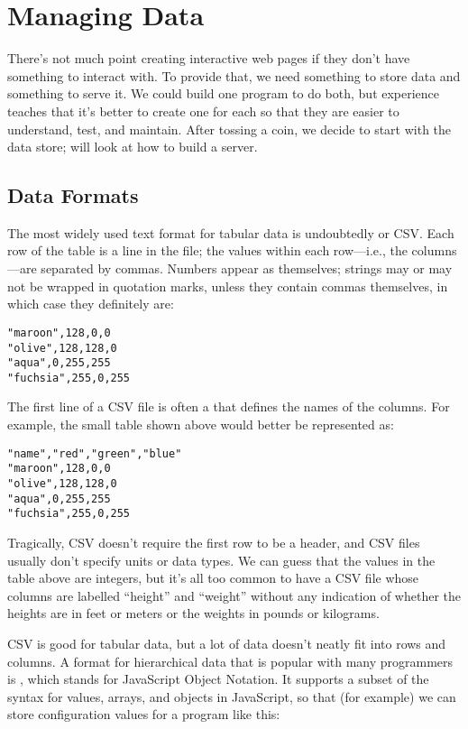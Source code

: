 \chapter{Managing Data}\label{s:dataman}

There's not much point creating interactive web pages
if they don't have something to interact with.
To provide that,
we need something to store data and something to serve it.
We could build one program to do both,
but experience teaches that it's better to create one for each
so that they are easier to understand, test, and maintain.
After tossing a coin,
we decide to start with the data store;
 will look at how to build a server.

\section{Data Formats}\label{s:dataman-formats}

The most widely used text format for tabular data is undoubtedly
 or CSV.
Each row of the table is a line in the file;
the values within each row---i.e., the columns---are separated by commas.
Numbers appear as themselves;
strings may or may not be wrapped in quotation marks,
unless they contain commas themselves,
in which case they definitely are:

\begin{verbatim}
"maroon",128,0,0
"olive",128,128,0
"aqua",0,255,255
"fuchsia",255,0,255
\end{verbatim}

The first line of a CSV file is often a 
that defines the names of the columns.
For example,
the small table shown above would better be represented as:

\begin{verbatim}
"name","red","green","blue"
"maroon",128,0,0
"olive",128,128,0
"aqua",0,255,255
"fuchsia",255,0,255
\end{verbatim}

Tragically,
CSV doesn't require the first row to be a header,
and CSV files usually don't specify units or data types.
We can guess that the values in the table above are integers,
but it's all too common to have a CSV file whose columns are labelled ``height'' and ``weight''
without any indication of whether the heights are in feet or meters
or the weights in pounds or kilograms.

CSV is good for tabular data,
but a lot of data doesn't neatly fit into rows and columns.
A format for hierarchical data that is popular with many programmers is ,
which stands for JavaScript Object Notation.
It supports a subset of the syntax for values, arrays, and objects in JavaScript,
so that (for example)
we can store configuration values for a program like this:

